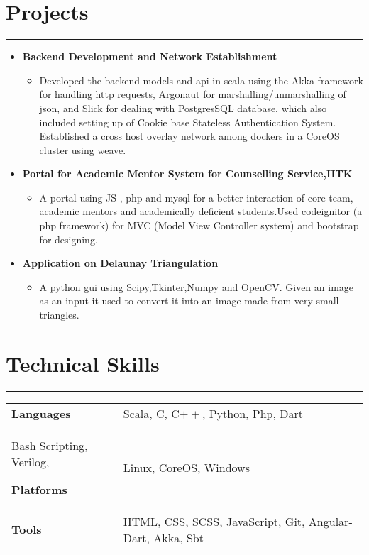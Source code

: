 \documentclass[a4paper]{article}
\begin{document}
\section*{Projects}
\hrule
\vspace{3mm}
  \begin{itemize}
  \item
   \textbf{Backend Development and Network Establishment}
  \begin{itemize}
       \it   under Prof. Manindra Agarwal
	   \item Developed the backend models and api in scala using the Akka framework
             for handling http requests, Argonaut for marshalling/unmarshalling of json,
             and Slick for dealing with PostgresSQL database, which also included
             setting up of Cookie base Stateless Authentication System.\\
             Established a cross host overlay network among dockers in a CoreOS 
              cluster using weave.
    \end{itemize}
   \item 
   \textbf{Portal for Academic Mentor System for Counselling Service,IITK}
	   \begin{itemize}
	    \item A portal using JS , php and mysql for a better interaction of core team, academic mentors and academically 
		  deficient students.Used codeignitor (a php framework) for MVC (Model View Controller system) 
		  and bootstrap for designing.
	   \end{itemize}
    \item
      \textbf{Application on Delaunay  Triangulation}
	\begin{itemize}
	 \item A python gui using Scipy,Tkinter,Numpy and OpenCV. 
	      Given an image as an input it used to convert it into an image made from very small triangles.
	\end{itemize}
  \end{itemize}

  
 \section*{Technical Skills}
 \hrule
 \vspace{3mm}
  \begin{tabular}{@{}m{4.0cm}m{13cm}@{}}
   \textbf{\textrm{Languages}} & 
Scala, C, C$++$, Python, Php, Dart\\
Bash Scripting, Verilog, 
    
  \textbf{\textrm{Platforms}} &
  Linux, CoreOS, Windows\\
  
  \textbf{\textrm{Tools}} &
  HTML, CSS, SCSS, JavaScript, Git, Angular-Dart, Akka, Sbt \\
  \end{tabular}
\end{document}
